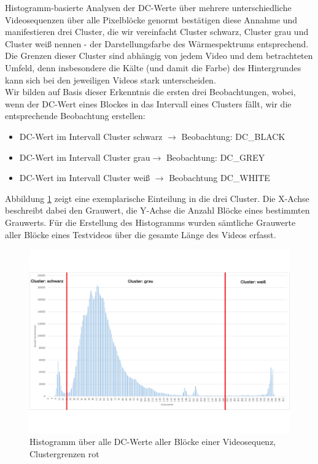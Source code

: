 Histogramm-basierte Analysen der DC-Werte über mehrere unterschiedliche Videosequenzen über alle Pixelblöcke genormt bestätigen diese Annahme und manifestieren drei Cluster, die wir vereinfacht Cluster schwarz, Cluster grau und Cluster weiß nennen - der Darstellungsfarbe des Wärmespektrums entsprechend.
Die Grenzen dieser Cluster sind abhängig von jedem Video und dem betrachteten Umfeld, denn insbesondere die Kälte (und damit die Farbe) des Hintergrundes kann sich bei den jeweiligen Videos stark unterscheiden.\\
Wir bilden auf Basis dieser Erkenntnis die ersten drei Beobachtungen, wobei, wenn der DC-Wert eines Blockes in das Intervall eines Clusters fällt, wir die entsprechende Beobachtung erstellen:
\begin{itemize}
	\item DC-Wert im Intervall Cluster schwarz $\rightarrow$ Beobachtung: DC\_BLACK
	\item DC-Wert im Intervall Cluster grau$\rightarrow$ Beobachtung: DC\_GREY
	\item DC-Wert im Intervall Cluster weiß $\rightarrow$ Beobachtung DC\_WHITE
\end{itemize}
Abbildung \ref{fig:histogram} zeigt eine exemplarische Einteilung in die drei Cluster.
Die X-Achse beschreibt dabei den Grauwert, die Y-Achse die Anzahl Blöcke eines bestimmten Grauwerts.
Für die Erstellung des Histogramms wurden sämtliche Grauwerte aller Blöcke eines Testvideos über die gesamte Länge des Videos erfasst.
\begin{figure}[H]
	\centering
	\includegraphics[trim=0cm 3cm 0cm 3cm, clip=true,width=1\textwidth]{bilder/04_histogram_cluster.pdf}
	\caption{Histogramm über alle DC-Werte aller Blöcke einer Videosequenz, Clustergrenzen rot}
	\label{fig:histogram}
\end{figure}

